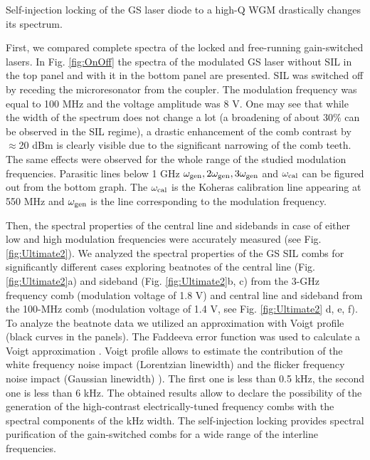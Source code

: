 \documentclass[a4paper, amsfonts, amssymb, amsmath, reprint, showkeys, nofootinbib, twoside,longbibliography, aps]{revtex4-1}
\begin{document}
Self-injection locking of the GS laser diode to a high-Q WGM drastically changes its spectrum.


First, we compared complete spectra of the locked and free-running gain-switched lasers.
In Fig. \ref{fig:OnOff} the spectra of the modulated GS laser without SIL in the top panel and with it in the bottom panel are presented. SIL was switched off by receding the microresonator from the coupler. The modulation frequency was equal to 100 MHz and the voltage amplitude was 8 V. One may see that while the width of the spectrum does not change a lot  (a broadening of about 30$\%$ can be observed in the SIL regime), a drastic enhancement of the comb contrast by $\approx$20 dBm is clearly visible due to the significant narrowing of the comb teeth. The same effects were observed for the whole range of the studied modulation frequencies. Parasitic lines below 1 GHz $\omega_{\rm gen}, 2\omega_{\rm gen}, 3\omega_{\rm gen}$ and $\omega_{\rm cal}$ can be figured out from the bottom graph. The $\omega_{\rm cal}$ is the Koheras calibration line appearing at 550 MHz and $\omega_{\rm gen}$ is the line corresponding to the modulation frequency.





Then, the spectral properties of the central line and sidebands in case of either low and high modulation frequencies were accurately measured (see Fig. \ref{fig:Ultimate2}). We analyzed the spectral properties of the GS SIL combs for significantly different cases exploring beatnotes of the central line (Fig. \ref{fig:Ultimate2}a) and sideband (Fig. \ref{fig:Ultimate2}b, c) from the 3-GHz frequency comb (modulation voltage of 1.8 V) and central line and sideband from the 100-MHz comb (modulation voltage of 1.4 V, see Fig. \ref{fig:Ultimate2} d, e, f). To analyze the beatnote data we utilized an approximation with Voigt profile (black curves in the panels). The Faddeeva error function was used to calculate a Voigt approximation \cite{ABRAROV20111894}. Voigt profile allows to estimate the contribution of the white frequency noise impact (Lorentzian linewidth) and the flicker frequency noise impact (Gaussian linewidth) \cite{galiev2018spectrum}). The first one is less than 0.5 kHz, the second one is less than 6 kHz.
The obtained results allow to declare the possibility of the generation of the high-contrast electrically-tuned frequency combs with the spectral components of the kHz width. The self-injection locking provides spectral purification of the gain-switched combs for a wide range of the interline frequencies.
\end{document}
